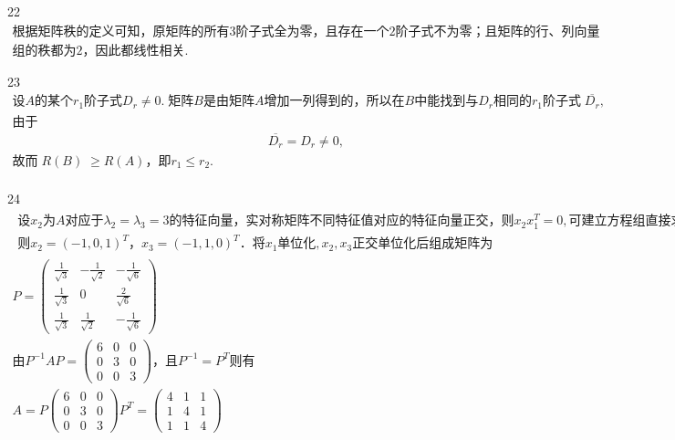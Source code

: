 22
$\begin{array}{l}\mathrm{根据矩阵秩的定义可知}，\mathrm{原矩阵的所有}3\mathrm{阶子式全为零}，\mathrm{且存在一个}2\mathrm{阶子式不为零}；\mathrm{且矩阵的行}、\mathrm{列向量}\\\mathrm{组的秩都为}2，\mathrm{因此都线性相关}.\end{array}$


23
$\begin{array}{l}设A\mathrm{的某个}r_1\mathrm{阶子式}D_r\neq0.\;\mathrm{矩阵}B\mathrm{是由矩阵}A\mathrm{增加一列得到的}，\mathrm{所以在}B\mathrm{中能找到与}D_r\mathrm{相同的}r_1\mathrm{阶子式}\;\overline{D_r},\\\mathrm{由于}\\\;\;\;\;\;\;\;\;\;\;\;\;\;\;\;\;\;\;\;\;\;\;\;\;\;\;\;\;\;\;\;\;\;\;\;\;\;\;\;\;\;\;\;\;\;\;\;\;\;\;\;\;\;\;\;\;\;\;\;\;\;\;\;\;\;\;\;\;\;\;\;\;\overline{D_r}=D_r\neq0,\\\mathrm{故而}\;R(B)\;\geq R(A)，即r_1\leq r_2.\\\end{array}$


24
$\begin{array}{l}\begin{array}{l}设x_2为A\mathrm{对应于}\lambda_2=\lambda_3=3\mathrm{的特征向量}，\mathrm{实对称矩阵不同特征值对应的特征向量正交}，则x_2x_1^T=0,\mathrm{可建立方程组直接求解}；\;\\则x_2={(-1,0,1)}^T，x_3={(-1,1,0)}^T．将x_1\mathrm{单位化},x_2,x_3\mathrm{正交单位化后组成矩阵为}\end{array}\\P=\begin{pmatrix}\frac1{\sqrt3}&-\frac1{\sqrt2}&-\frac1{\sqrt6}\\\frac1{\sqrt3}&0&\frac2{\sqrt6}\\\frac1{\sqrt3}&\frac1{\sqrt2}&-\frac1{\sqrt6}\end{pmatrix}\\由P^{-1}AP=\begin{pmatrix}6&0&0\\0&3&0\\0&0&3\end{pmatrix}，且P^{-1}=P^T\mathrm{则有}\\A=P\begin{pmatrix}6&0&0\\0&3&0\\0&0&3\end{pmatrix}P^T=\begin{pmatrix}4&1&1\\1&4&1\\1&1&4\end{pmatrix}\\\end{array}$



